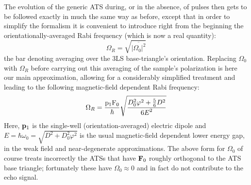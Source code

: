 \documentclass[10pt]{article}
\begin{document}
The evolution of the generic ATS during, or in the absence, of pulses then gets to 
be followed exactly in much the same way as before, except that in order to 
simplify the formalism it is convenient to introduce right from the beginning the 
orientationally-averaged Rabi frequency (which is now a real quantity):
\begin{equation}
{\Omega }_R=\sqrt{\overline{{|{\Omega }_0|}^2}}
\end{equation}
the bar denoting averaging over the 3LS base-triangle's orientation. Replacing 
${\Omega }_0$ with ${\Omega }_R$ before carrying out this averaging of the 
sample's polarization is here our main approximation, allowing for a considerably 
simplified treatment and leading to the following magnetic-field dependent Rabi
frequency:
\begin{equation}
{\Omega }_R=\frac{{{\rm p}}_{{\rm 1}}{{\rm F}}_0}{\hbar }\sqrt{\frac{D^2_0\varphi^2+\frac{5}{6}D^2}{{6E}^2}}
\end{equation}
Here, ${\bf p}_1$ is the single-well (orientation-averaged) electric dipole and 
$E=\hbar\omega_0=\sqrt{D^2+D^2_0\varphi^2}$ is the usual magnetic-field 
dependent lower energy gap, in the weak field and near-degenerate approximations. 
The above form for $\Omega_0$ of course treats incorrectly the ATSs that have 
${\bf F}_0$ roughly orthogonal to the ATS base triangle; fortunately these have 
$\Omega_0\approx 0$ and in fact do not contribute to the echo signal.
\end{document}
